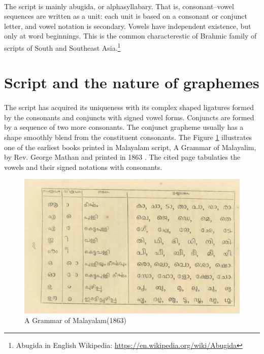 \documentclass[10pt]{article}
\begin{document}
\paragraph{}
The script is mainly abugida, or alphasyllabary. That is, consonant–vowel sequences are written as a unit: each unit is based on a consonant or conjunct letter, and vowel notation is secondary. Vowels have independent existence, but only at word beginnings. This is the common characterestic of  Brahmic family of scripts of South and Southeast Asia.\footnote{Abugida in English Wikipedia: \url{https://en.wikipedia.org/wiki/Abugida}}

\section{Script and the nature of graphemes}

\paragraph{}
The script has acquired its uniqueness with its complex shaped ligatures formed by the consonants and conjuncts with signed vowel forms. Conjuncts are formed by a sequence of two more consonants. The conjunct grapheme usually has a shape smoothly blend from the constituent consonants. The Figure \ref{mathan} illustrates one of the earliest books printed in Malayalam script, A Grammar of Malayalim,  by Rev. George Mathan  and printed in 1863 \cite{georgemathan}. The cited page tabulaties the vowels and their signed notations with consonants. 

\begin{figure}[h]
	\centering
	\includegraphics[width=1.0\textwidth]{images/mathanSymbols.png}
	\caption{A Grammar of Malayalam(1863)}
	\label{mathan}
\end{figure} 
\end{document}
